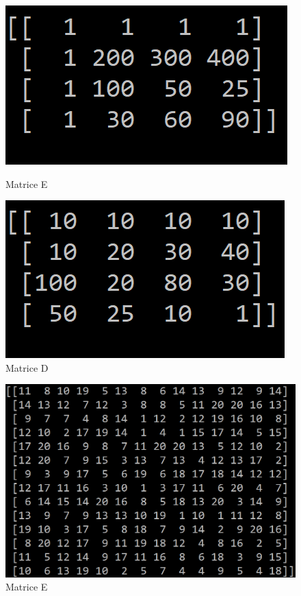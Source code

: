 \documentclass[11pt]{article} %
\begin{document}
\begin{figure}[!htb]
   \begin{minipage}{0.48\textwidth}
     \centering
     \includegraphics[width=.9\linewidth]{C.png}
     \caption{Matrice E}
   \end{minipage}\hfill
   \begin {minipage}{0.48\textwidth}
     \centering
     \includegraphics[width=.9\linewidth]{D.png}
     \caption{Matrice D}
   \end{minipage}
\end{figure}

\begin{figure}[!h]
  \begin{center}
    \includegraphics[width=.7\linewidth]{E.png}
    \caption{Matrice E}
  \end{center}
\end{figure}
\end{document}

